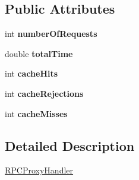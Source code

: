 \subsection*{\-Public \-Attributes}
\begin{DoxyCompactItemize}
\item 
\hypertarget{classRPCProxyHandler_a2ac0df19d0b5b6f486593886f281cc37}{int {\bfseries number\-Of\-Requests}}\label{classRPCProxyHandler_a2ac0df19d0b5b6f486593886f281cc37}

\item 
\hypertarget{classRPCProxyHandler_a584e1d2460a6d189e7830226d0d48ed3}{double {\bfseries total\-Time}}\label{classRPCProxyHandler_a584e1d2460a6d189e7830226d0d48ed3}

\item 
\hypertarget{classRPCProxyHandler_a382e5666620ce07bdd771f62c2494110}{int {\bfseries cache\-Hits}}\label{classRPCProxyHandler_a382e5666620ce07bdd771f62c2494110}

\item 
\hypertarget{classRPCProxyHandler_a647a7727373b329adc985b59ca2710d5}{int {\bfseries cache\-Rejections}}\label{classRPCProxyHandler_a647a7727373b329adc985b59ca2710d5}

\item 
\hypertarget{classRPCProxyHandler_a75985d9116b06d96c6e7e23c10e1c12e}{int {\bfseries cache\-Misses}}\label{classRPCProxyHandler_a75985d9116b06d96c6e7e23c10e1c12e}

\end{DoxyCompactItemize}


\subsection{\-Detailed \-Description}

\begin{DoxyItemize}
\item \hyperlink{classRPCProxyHandler}{\-R\-P\-C\-Proxy\-Handler} 
\end{DoxyItemize}

